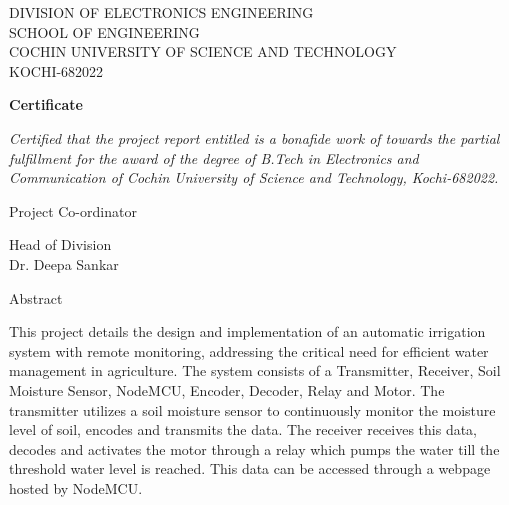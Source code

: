 \documentclass[12pt, a4paper]{report}
\newcommand{\chapterFont}{\fontsize{18}{18}\selectfont}
\newcommand{\titlepagefont}{\fontsize{13}{13}\selectfont}
\newcommand{\certificateTitle}[1]{{\centering \fontsize{18}{18}\selectfont #1}}
\newcommand{\headingc}[1]{
  \begin{center}
    \chapterFont #1
  \end{center}
}
\newcommand{\addsvg}[2]{}
\begin{document}
\vspace*{3cm}
\begin{center}

  \certificateTitle{
    DIVISION OF ELECTRONICS ENGINEERING \\
    SCHOOL OF ENGINEERING \\
    COCHIN UNIVERSITY OF SCIENCE AND TECHNOLOGY \\
    KOCHI-682022 \\
  }
  \vspace{1cm}
  \addsvg{cusat}{1.5in}\par
  \vspace{1cm}
  \certificateTitle{\textbf {Certificate}}
  \vspace{.3cm}

  \titlepagefont
  \textit{
    Certified that the project report entitled 
    is a bonafide work of  towards the partial
    fulfillment for the award of the
    degree of B.Tech in Electronics and Communication of Cochin
    University of Science and Technology, Kochi-682022.
  }

  \vspace{3cm}
  \begin{minipage}[t][][r]{.4\linewidth}
    Project Co-ordinator
  \end{minipage}
  \hfill
  \begin{minipage}[t][][l]{.4\linewidth}
    \begin{flushright}
      Head of Division\\
      Dr. Deepa Sankar
    \end{flushright}
  \end{minipage}
\end{center}

\newpage
{}
\headingc{Abstract}

This project details the design and implementation of an automatic
irrigation system with remote monitoring, addressing the critical
need for efficient water management in agriculture. The system
consists of a Transmitter, Receiver, Soil Moisture Sensor, NodeMCU,
Encoder, Decoder, Relay and Motor. The transmitter utilizes a soil
moisture sensor to continuously monitor the moisture level of soil,
encodes and transmits the data. The receiver receives this data,
decodes and activates the motor through a relay which pumps the water
till the threshold water level is reached. This data can be accessed
through a webpage hosted by NodeMCU.
\end{document}

